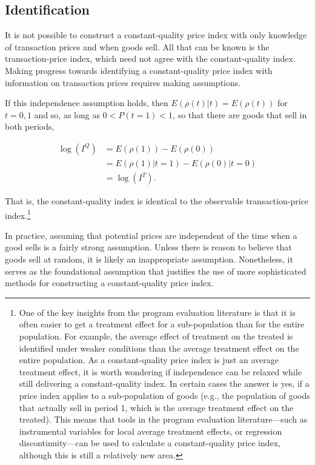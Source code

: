 \documentclass[]{article}
\begin{document}
\hypertarget{identification}{%
\subsection{Identification}\label{identification}}

It is not possible to construct a constant-quality price index with only knowledge of transaction prices and when goods sell. All that can be known is the transaction-price index, which need not agree with the constant-quality index. Making progress towards identifying a constant-quality price index with information on transaction prices requires making assumptions.

If this independence assumption holds, then \(E(\rho(t) | t) = E(\rho(t))\) for \(t=0,1\) and so, as long as \(0 < P(t = 1) < 1\), so that there are goods that sell in both periods,

\begin{align*}
\log(I^{Q}) &= E(\rho(1)) - E(\rho(0)) \\ 
&= E(\rho(1) | t = 1) - E(\rho(0) | t = 0) \\
&= \log(I^{T}).
\end{align*}

That is, the constant-quality index is identical to the observable transaction-price index.\footnote{One of the key insights from the program evaluation literature is that it is often easier to get a treatment effect for a sub-population than for the entire population. For example, the average effect of treatment on the treated is identified under weaker conditions than the average treatment effect on the entire population. As a constant-quality price index is just an average treatment effect, it is worth wondering if independence can be relaxed while still delivering a constant-quality index. In certain cases the answer is yes, if a price index applies to a sub-population of goods (e.g., the population of goods that actually sell in period 1, which is the average treatment effect on the treated). This means that tools in the program evaluation literature---such as instrumental variables for local average treatment effects, or regression discontinuity---can be used to calculate a constant-quality price index, although this is still a relatively new area.}

In practice, assuming that potential prices are independent of the time when a good sells is a fairly strong assumption. Unless there is reason to believe that goods sell at random, it is likely an inappropriate assumption. Nonetheless, it serves as the foundational assumption that justifies the use of more sophisticated methods for constructing a constant-quality price index.
\end{document}
